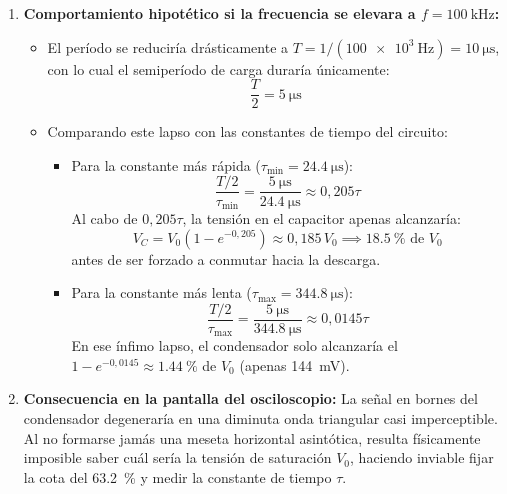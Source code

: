 \begin{appendices}
\begin{enumerate}
    \item \textbf{Comportamiento hipotético si la frecuencia se elevara a $f = \qty{100}{\kilo\hertz}$:}
    \begin{itemize}
        \item El período se reduciría drásticamente a $T = 1 / (\qty{100e3}{\hertz}) = \qty{10}{\micro\second}$, con lo cual el semiperíodo de carga duraría únicamente:
        \begin{equation*}
            \frac{T}{2} = \qty{5}{\micro\second}
        \end{equation*}
        \item Comparando este lapso con las constantes de tiempo del circuito:
        \begin{itemize}
            \item Para la constante más rápida ($\tau_{\min} = \qty{24,4}{\micro\second}$):
            \begin{equation*}
                \frac{T/2}{\tau_{\min}} = \frac{\qty{5}{\micro\second}}{\qty{24,4}{\micro\second}} \approx 0{,}205\tau
            \end{equation*}
            Al cabo de $0{,}205\tau$, la tensión en el capacitor apenas alcanzaría:
            \begin{equation*}
                V_C = V_0 \left( 1 - e^{-0{,}205} \right) \approx 0{,}185\,V_0 \implies \qty{18,5}{\percent} \text{ de } V_0
            \end{equation*}
            antes de ser forzado a conmutar hacia la descarga.
            \item Para la constante más lenta ($\tau_{\max} = \qty{344,8}{\micro\second}$):
            \begin{equation*}
                \frac{T/2}{\tau_{\max}} = \frac{\qty{5}{\micro\second}}{\qty{344,8}{\micro\second}} \approx 0{,}0145\tau
            \end{equation*}
            En ese ínfimo lapso, el condensador solo alcanzaría el $1 - e^{-0{,}0145} \approx \qty{1,44}{\percent}$ de $V_0$ (apenas \qty{144}{\milli\volt}).
        \end{itemize}
    \end{itemize}
    \item \textbf{Consecuencia en la pantalla del osciloscopio:} La señal en bornes del condensador degeneraría en una diminuta onda triangular casi imperceptible. Al no formarse jamás una meseta horizontal asintótica, resulta físicamente imposible saber cuál sería la tensión de saturación $V_0$, haciendo inviable fijar la cota del \qty{63,2}{\percent} y medir la constante de tiempo $\tau$.
\end{enumerate}


\end{appendices}
